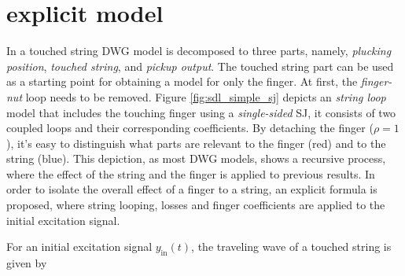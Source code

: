\documentclass{sigchi}
\begin{document}
\section{explicit model}
In \cite{pakarinen_physical_2005} a touched string DWG model is decomposed to three parts, namely, \textit{plucking position}, \textit{touched string}, and \textit{pickup output}.
The touched string part can be used as a starting point for obtaining a model for only the finger.
At first, the \textit{finger-nut} loop needs to be removed.
Figure \ref{fig:sdl_simple_sj} depicts an \textit{string loop} model that includes the touching finger using a \textit{single-sided} SJ, it consists of two coupled loops and their corresponding coefficients.
By detaching the finger ($\rho = 1$), it's easy to distinguish what parts are relevant to the finger (red) and to the string (blue).
This depiction, as most DWG models, shows a recursive process, where the effect of the string and the finger is applied to previous results.
In order to isolate the overall effect of a finger to a string, an explicit formula is proposed, where string looping, losses and finger coefficients are applied to the initial excitation signal.

\begin{figure*}[h]
	\centering
	\scalebox{0.8}{}
	\caption{String loop with a scattering junction. $N$-roundtrip (blue), $F$-roundtrip (red)}
	\label{fig:sdl_simple_sj}
\end{figure*}


For an initial excitation signal $y_{\textrm{in}}(t)$, the traveling wave of a touched string is given by
\end{document}
